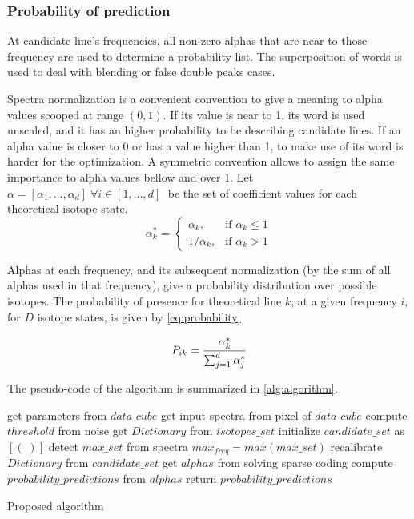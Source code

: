 \subsubsection{Probability of prediction}
At candidate line's frequencies, all non-zero alphas that are near to those frequency are used to determine a probability list. The superposition of words is used to deal with blending or false double peaks cases.

Spectra normalization is a convenient convention to give a meaning to alpha values scooped at range $(0,1)$.
If its value is near to 1, its word is used unscaled, and it has an higher probability to be describing candidate lines.
If an alpha value is closer to 0 or has a value higher than 1, to make use of its word is harder for the optimization. 
A symmetric convention allows to assign the same importance to alpha values bellow and over 1.
Let $\alpha = [ \alpha_1, \ldots,  \alpha_d] \; \forall i \in [1, \ldots, d] \;$ be the set of coefficient values for each theoretical isotope state.
\begin{equation}
\alpha^{*}_{k}\text{ = }
\begin{cases}
\alpha_{k},& \text{if } \alpha_{k} \le 1\\
1/\alpha_{k}, & \text{if } \alpha_{k} > 1
\end{cases}
\label{eq:alpha}
\end{equation}

Alphas at each frequency, and its subsequent normalization (by the sum of all alphas used in that frequency), give a probability distribution over possible isotopes.
The probability of presence for theoretical line $k$, at a given frequency $i$, for $D$ isotope states, is given by \ref{eq:probability} 

\begin{equation}
P_{ik} = \cfrac{\alpha^{*}_k}{\sum_{j=1}^{d} \alpha^{*}_j}
\label{eq:probability}
\end{equation}

The pseudo-code of the algorithm is summarized in \ref{alg:algorithm}.

\begin{algorithm}[H]
            get parameters from $data\_cube$\;
            get input spectra from pixel of $data\_cube$\;
            compute $threshold$ from noise\;
            get $Dictionary$ from $isotopes\_set$\;
            initialize $candidate\_set$ as $[(\;)]$\;
            detect $max\_set$ from spectra\;
            $max_{freq} = max(max\_set)$\;
            recalibrate $Dictionary$ from $candidate\_set$\;
            get $alphas$ from solving sparse coding\;
            compute $probability\_predictions$ from $alphas$\;
            return $probability\_predictions$\;
    \caption{Proposed algorithm}
   	\label{alg:algorithm}
\end{algorithm}


